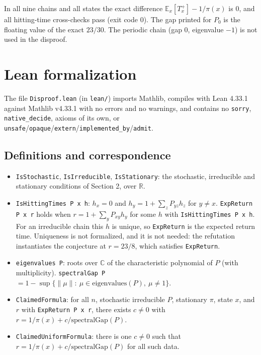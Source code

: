 \documentclass[11pt,a4paper]{article}
\begin{document}
In all nine chains and all states the exact difference $\mathbb{E}_x[T_x^+]-1/\pi(x)$ is $0$, and all hitting-time cross-checks pass (exit code 0). The gap printed for $P_0$ is the floating value of the exact $23/30$. The periodic chain (gap $0$, eigenvalue $-1$) is not used in the disproof.

\section{Lean formalization}

The file \texttt{Disproof.lean} (in \texttt{lean/}) imports Mathlib, compiles with Lean 4.33.1 against Mathlib v4.33.1 with no errors and no warnings, and contains no \texttt{sorry}, \texttt{native\_decide}, axioms of its own, or \texttt{unsafe}/\texttt{opaque}/\texttt{extern}/\texttt{implemented\_by}/\texttt{admit}.

\subsection*{Definitions and correspondence}

\begin{itemize}
\item \texttt{IsStochastic}, \texttt{IsIrreducible}, \texttt{IsStationary}: the stochastic, irreducible and stationary conditions of Section 2, over $\mathbb{R}$.
\item \texttt{IsHittingTimes P x h}: $h_x=0$ and $h_y=1+\sum_z P_{yz}h_z$ for $y\neq x$. \texttt{ExpReturn P x r} holds when $r=1+\sum_y P_{xy}h_y$ for some $h$ with \texttt{IsHittingTimes P x h}. For an irreducible chain this $h$ is unique, so \texttt{ExpReturn} is the expected return time. Uniqueness is not formalized, and it is not needed: the refutation instantiates the conjecture at $r=23/8$, which satisfies \texttt{ExpReturn}.
\item \texttt{eigenvalues P}: roots over $\mathbb{C}$ of the characteristic polynomial of $P$ (with multiplicity). \texttt{spectralGap P} $=1-\sup\{\|\mu\|:\ \mu\in\mathrm{eigenvalues}(P),\ \mu\neq 1\}$.
\item \texttt{ClaimedFormula}: for all $n$, stochastic irreducible $P$, stationary $\pi$, state $x$, and $r$ with \texttt{ExpReturn P x r}, there exists $c\neq 0$ with $r=1/\pi(x)+c/\mathrm{spectralGap}(P)$.
\item \texttt{ClaimedUniformFormula}: there is one $c\neq 0$ such that $r=1/\pi(x)+c/\mathrm{spectralGap}(P)$ for all such data.
\end{itemize}
\end{document}
